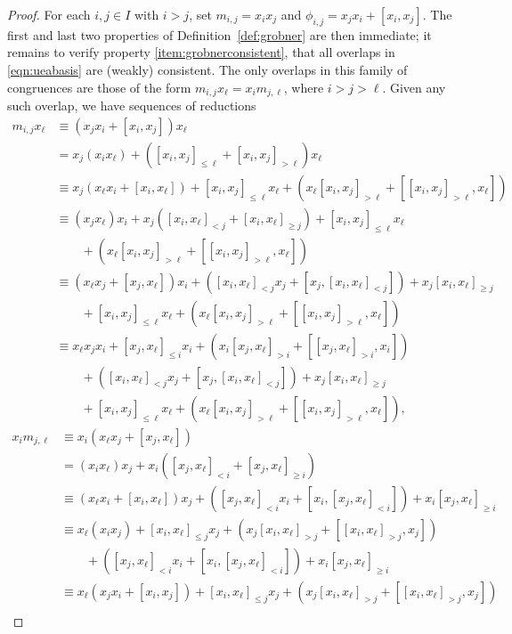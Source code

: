 \begin{proof}
For each $i,j\in I$ with $i>j$, set $m_{i,j}=x_ix_j$ and $\phi_{i,j}=x_jx_i+[x_i,x_j]$. The first and last two properties of Definition~\ref{def:grobner} are then immediate; it remains to verify property \eqref{item:grobnerconsistent}, that all overlaps in \eqref{eqn:ueabasis} are (weakly) consistent. The only overlaps in this family of congruences are those of the form $m_{i,j}x_\ell=x_im_{j,\ell}$, where $i>j>\ell$. Given any such overlap, we have sequences of reductions
\begin{align*}
m_{i,j}x_\ell&\equiv(x_jx_i+[x_i,x_j])x_\ell\\
&=x_j(x_ix_\ell)+([x_i,x_j]_{\le\ell}+[x_i,x_j]_{>\ell})x_\ell\\
&\equiv x_j(x_\ell x_i+[x_i,x_\ell])+[x_i,x_j]_{\le\ell}x_\ell+(x_\ell[x_i,x_j]_{>\ell}+[[x_i,x_j]_{>\ell},x_\ell])\\
&\equiv(x_jx_\ell)x_i+x_j([x_i,x_\ell]_{<j}+[x_i,x_\ell]_{\ge j})+[x_i,x_j]_{\le\ell}x_\ell\\
&\qquad+(x_\ell[x_i,x_j]_{>\ell}+[[x_i,x_j]_{>\ell},x_\ell])\\
&\equiv(x_\ell x_j+[x_j,x_\ell])x_i+([x_i,x_\ell]_{<j}x_j+[x_j,[x_i,x_\ell]_{<j}])+x_j[x_i,x_\ell]_{\ge j}\\
&\qquad+[x_i,x_j]_{\le\ell}x_\ell+(x_\ell[x_i,x_j]_{>\ell}+[[x_i,x_j]_{>\ell},x_\ell])\\
&\equiv x_\ell x_jx_i+[x_j,x_\ell]_{\le i}x_i+(x_i[x_j,x_\ell]_{>i}+[[x_j,x_\ell]_{>i},x_i])\\
&\qquad+([x_i,x_\ell]_{<j}x_j+[x_j,[x_i,x_\ell]_{<j}])+x_j[x_i,x_\ell]_{\ge j}\\
&\qquad+[x_i,x_j]_{\le\ell}x_\ell+(x_\ell[x_i,x_j]_{>\ell}+[[x_i,x_j]_{>\ell},x_\ell]),
\end{align*}
\begin{align*}
x_im_{j,\ell}&\equiv x_i(x_\ell x_j+[x_j,x_\ell])\\
&=(x_ix_\ell)x_j+x_i([x_j,x_\ell]_{<i}+[x_j,x_\ell]_{\ge i})\\
&\equiv(x_\ell x_i+[x_i,x_\ell])x_j+([x_j,x_\ell]_{<i}x_i+[x_i,[x_j,x_\ell]_{<i}])+x_i[x_j,x_\ell]_{\ge i}\\
&\equiv x_\ell(x_ix_j)+[x_i,x_\ell]_{\le j}x_j+(x_j[x_i,x_\ell]_{>j}+[[x_i,x_\ell]_{>j},x_j])\\
&\qquad+([x_j,x_\ell]_{<i}x_i+[x_i,[x_j,x_\ell]_{<i}])+x_i[x_j,x_\ell]_{\ge i}\\
&\equiv x_\ell(x_jx_i+[x_i,x_j])+[x_i,x_\ell]_{\le j}x_j+(x_j[x_i,x_\ell]_{>j}+[[x_i,x_\ell]_{>j},x_j])\\

\end{align*}
\end{proof}
